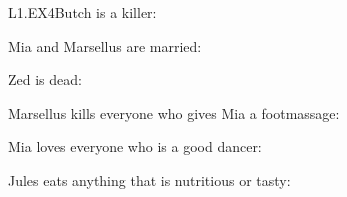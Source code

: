 \begin{mozartANSWER}{L1.EX4}Butch is a killer: \mozartEMPTY
\begin{mozartCODEDISPLAY}\end{mozartCODEDISPLAY}
 \mozartEMPTY
Mia and Marsellus are married: \mozartEMPTY
\begin{mozartCODEDISPLAY}\end{mozartCODEDISPLAY}
 \mozartEMPTY
Zed is dead: \mozartEMPTY
\begin{mozartCODEDISPLAY}\end{mozartCODEDISPLAY}
 \mozartEMPTY
Marsellus kills everyone who gives Mia a footmassage: \mozartEMPTY
\begin{mozartCODEDISPLAY}\end{mozartCODEDISPLAY}
 \mozartEMPTY
Mia loves everyone who is a good dancer: \mozartEMPTY
\begin{mozartCODEDISPLAY}\end{mozartCODEDISPLAY}
 \mozartEMPTY
Jules eats anything that is nutritious or tasty: \mozartEMPTY
\begin{mozartCODEDISPLAY}\end{mozartCODEDISPLAY}
\end{mozartANSWER}
